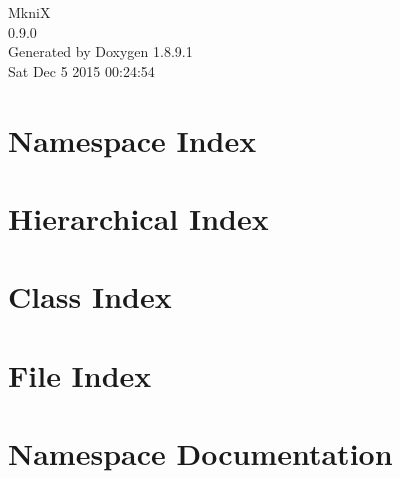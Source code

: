 \documentclass[twoside]{article}
\newcommand{\+}{\discretionary{\mbox{\scriptsize$\hookleftarrow$}}{}{}}
\begin{document}
\hypersetup{pageanchor=false,
             bookmarks=true,
             bookmarksnumbered=true,
             pdfencoding=unicode
            }
\begin{titlepage}
\vspace*{7cm}
\begin{center}%
{\Large Mkni\+X \\[1ex]\large 0.\+9.\+0 }\\
\vspace*{1cm}
{\large Generated by Doxygen 1.8.9.1}\\
\vspace*{0.5cm}
{\small Sat Dec 5 2015 00:24:54}\\
\end{center}
\end{titlepage}
\tableofcontents
{}
\hypersetup{pageanchor=true}

\section{Namespace Index}

\section{Hierarchical Index}

\section{Class Index}

\section{File Index}

\section{Namespace Documentation}


\end{document}
